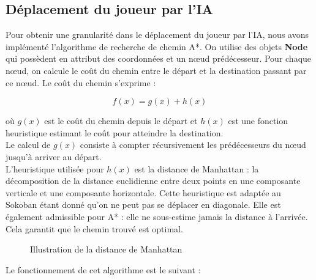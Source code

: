 \documentclass[a4paper,12pt]{article} %
\begin{document}
\subsection{Déplacement du joueur par l'IA}\label{astar}

Pour obtenir une granularité dans le déplacement du joueur par l'IA, nous avons implémenté l'algorithme de recherche de chemin A*. On utilise des objets \textbf{Node} qui possèdent en attribut des coordonnées et un nœud prédécesseur. Pour chaque nœud, on calcule le coût du chemin entre le départ et la destination passant par ce nœud. Le coût du chemin s'exprime :

$$ f(x) = g(x) + h(x)$$

où $g(x)$ est le coût du chemin depuis le départ et $h(x)$ est une fonction heuristique estimant le coût pour atteindre la destination.\\

Le calcul de $g(x)$ consiste à compter récursivement les prédécesseurs du nœud jusqu'à arriver au départ.\\
L'heuristique utilisée pour $h(x)$ est la distance de Manhattan : la décomposition de la distance euclidienne entre deux points en une composante verticale et une composante horizontale. Cette heuristique est adaptée au Sokoban étant donné qu'on ne peut pas se déplacer en diagonale. Elle est également admissible pour A* : elle ne sous-estime jamais la distance à l'arrivée. Cela garantit que le chemin trouvé est optimal.

\begin{figure}[!h]
\centering
{}
\caption{Illustration de la distance de Manhattan}
\end{figure}

Le fonctionnement de cet algorithme est le suivant :\\
\end{document}
